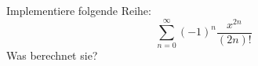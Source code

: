 \begin{aufg}
Implementiere folgende Reihe:
\[ \sum_{n=0}^{\infty} \left(-1\right)^n \frac{x^{2n}}{(2n)!} \]
Was berechnet sie?
\end{aufg}
